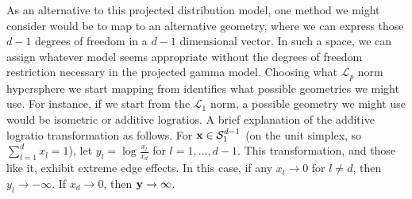 
As an alternative to this projected distribution model, one method we might consider would be to map
  to an alternative geometry, where we can express those $d-1$ degrees of freedom in a $d-1$
  dimensional vector.  In such a space, we can assign whatever model seems appropriate without the
  degrees of freedom restriction necessary in the projected gamma model.  Choosing what $\mathcal{L}_p$
  norm hypersphere we start mapping from identifies what possible geometries we might use.  For instance,
  if we start from the $\mathcal{L}_1$ norm, a possible geometry we might use would be isometric or
  additive logratios\cite{aitchison1982}.  A brief explanation of the additive logratio transformation
  as follows.  For ${\bf x}\in \mathcal{S}_{1}^{d-1}$ (on the unit simplex, so $\sum_{l = 1}^d x_l = 1$),
  let $y_l = \log\frac{x_l}{x_d}$ for $l = 1,\ldots,d-1$. This transformation, and those like it,
  exhibit extreme edge effects.  In this case, if any $x_l\to0$ for $l \neq d$, then $y_l\to-\infty$.
  If $x_d \to 0$, then ${\bf y}\to\infty$.

